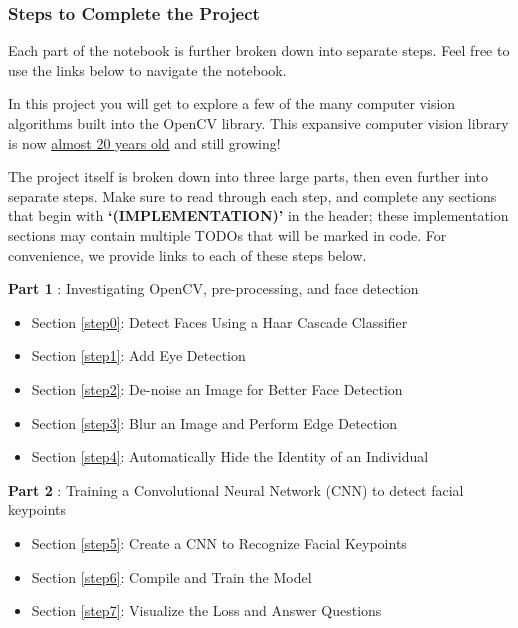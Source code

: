 \documentclass[11pt]{article}
\providecommand{\tightlist}{%
      \setlength{\itemsep}{0pt}\setlength{\parskip}{0pt}}
\begin{document}
    \hypertarget{steps-to-complete-the-project}{%
\subsubsection{Steps to Complete the
Project}\label{steps-to-complete-the-project}}

Each part of the notebook is further broken down into separate steps.
Feel free to use the links below to navigate the notebook.

In this project you will get to explore a few of the many computer
vision algorithms built into the OpenCV library. This expansive computer
vision library is now
\href{https://en.wikipedia.org/wiki/OpenCV\#History}{almost 20 years
old} and still growing!

The project itself is broken down into three large parts, then even
further into separate steps. Make sure to read through each step, and
complete any sections that begin with \textbf{`(IMPLEMENTATION)'} in the
header; these implementation sections may contain multiple TODOs that
will be marked in code. For convenience, we provide links to each of
these steps below.

\textbf{Part 1} : Investigating OpenCV, pre-processing, and face
detection

\begin{itemize}
\tightlist
\item
  Section \ref{step0}: Detect Faces Using a Haar Cascade Classifier
\item
  Section \ref{step1}: Add Eye Detection
\item
  Section \ref{step2}: De-noise an Image for Better Face Detection
\item
  Section \ref{step3}: Blur an Image and Perform Edge Detection
\item
  Section \ref{step4}: Automatically Hide the Identity of an Individual
\end{itemize}

\textbf{Part 2} : Training a Convolutional Neural Network (CNN) to
detect facial keypoints

\begin{itemize}
\tightlist
\item
  Section \ref{step5}: Create a CNN to Recognize Facial Keypoints
\item
  Section \ref{step6}: Compile and Train the Model
\item
  Section \ref{step7}: Visualize the Loss and Answer Questions
\end{itemize}
\end{document}
